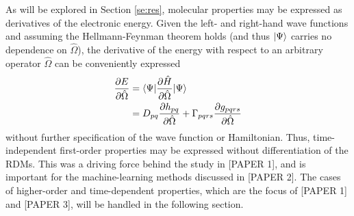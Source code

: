 As will be explored in Section \ref{se:res}, molecular properties may be expressed as 
derivatives of the electronic energy.\cite{Helgaker2012} Given the left- and right-hand wave functions 
and assuming the Hellmann-Feynman theorem\cite{Hellmann1937,Feynman1939} holds 
(and thus $| \Psi \rangle$ carries no dependence 
on $\hat{\Omega}$), the derivative of the energy with respect to an arbitrary operator 
$\hat\Omega$ can be conveniently expressed
\begin{equation} \label{eq:dE}
    \begin{aligned}
    \frac{\partial E}{\partial \hat\Omega} &= \langle\Psi |\frac{\partial \hat{H}}{\partial \hat\Omega}| \Psi \rangle\\
                                  &= D_{pq}\frac{\partial h_{pq}}{\partial \hat\Omega} + \Gamma_{pqrs}\frac{\partial g_{pqrs}}{\partial \hat\Omega}
    \end{aligned}
\end{equation}
without further specification of the wave function or Hamiltonian. 
Thus, time-independent first-order properties may be expressed without 
differentiation of the RDMs. This was a driving force behind the study in 
[PAPER 1], and is important for the machine-learning methods discussed in [PAPER 2]. The cases of 
higher-order and time-dependent properties, which are the
focus of [PAPER 1] and [PAPER 3], will be handled in the following section. 
